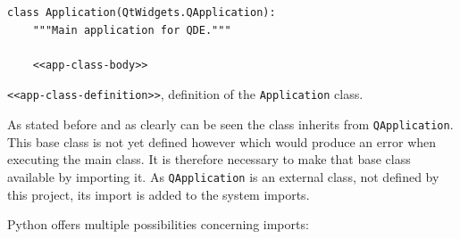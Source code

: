 \documentclass[10pt, openright, notitlepage]{scrreprt}
\begin{document}
\begin{listing}[H]
\begin{verbatim}
class Application(QtWidgets.QApplication):
    """Main application for QDE."""

    <<app-class-body>>
\end{verbatim}
\caption{\label{app-class-definition}
\texttt{<<app-class-definition>>}, definition of the \texttt{Application} class.}
\end{listing}

As stated before and as clearly can be seen the class inherits from
\texttt{QApplication}. This base class is not yet defined however which would produce
an error when executing the main class. It is therefore necessary to make that
base class available by importing it. As \texttt{QApplication} is an external class,
not defined by this project, its import is added to the system imports.

Python offers multiple possibilities concerning imports:
\end{document}
